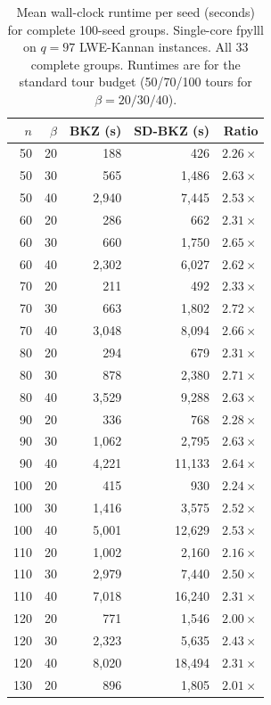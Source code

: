\documentclass[journal=cic,version=preprint]{iacrj}
\begin{document}
\begin{table}[tbp]
\centering
\caption{Mean wall-clock runtime per seed (seconds) for complete 100-seed groups. Single-core fpylll on $q=97$ LWE-Kannan instances. All 33 complete groups. Runtimes are for the standard tour budget (50/70/100 tours for $\beta=20/30/40$).\label{tab:runtime}}
\small
\begin{tabular}{rrrrr}
\hline
$n$ & $\beta$ & BKZ (s) & SD-BKZ (s) & Ratio \\
\hline
50  & 20 & 188   & 426   & $2.26\times$ \\
50  & 30 & 565   & 1{,}486  & $2.63\times$ \\
50  & 40 & 2{,}940  & 7{,}445  & $2.53\times$ \\
60  & 20 & 286   & 662   & $2.31\times$ \\
60  & 30 & 660   & 1{,}750  & $2.65\times$ \\
60  & 40 & 2{,}302  & 6{,}027  & $2.62\times$ \\
70  & 20 & 211   & 492   & $2.33\times$ \\
70  & 30 & 663   & 1{,}802  & $2.72\times$ \\
70  & 40 & 3{,}048  & 8{,}094  & $2.66\times$ \\
80  & 20 & 294   & 679   & $2.31\times$ \\
80  & 30 & 878   & 2{,}380  & $2.71\times$ \\
80  & 40 & 3{,}529  & 9{,}288  & $2.63\times$ \\
90  & 20 & 336   & 768   & $2.28\times$ \\
90  & 30 & 1{,}062  & 2{,}795  & $2.63\times$ \\
90  & 40 & 4{,}221  & 11{,}133 & $2.64\times$ \\
100 & 20 & 415   & 930   & $2.24\times$ \\
100 & 30 & 1{,}416  & 3{,}575  & $2.52\times$ \\
100 & 40 & 5{,}001  & 12{,}629 & $2.53\times$ \\
110 & 20 & 1{,}002  & 2{,}160  & $2.16\times$ \\
110 & 30 & 2{,}979  & 7{,}440  & $2.50\times$ \\
110 & 40 & 7{,}018  & 16{,}240 & $2.31\times$ \\
120 & 20 & 771   & 1{,}546  & $2.00\times$ \\
120 & 30 & 2{,}323  & 5{,}635  & $2.43\times$ \\
120 & 40 & 8{,}020  & 18{,}494 & $2.31\times$ \\
130 & 20 & 896   & 1{,}805  & $2.01\times$ \\

\end{tabular}
\end{table}
\end{document}
